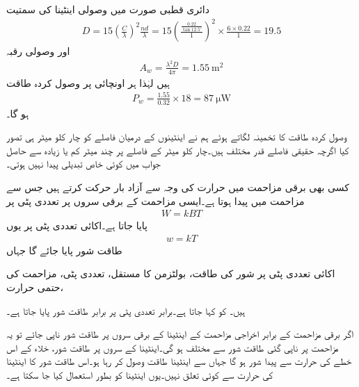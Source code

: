 دائری قطبی صورت میں وصولی اینٹینا کی سمتیت
\begin{align*}
D=15 \left(\frac{C}{\lambda}\right)^2\frac{n d}{\lambda}=15 \left(\frac{\frac{0.22}{\tan 12.5^{\circ}}}{1} \right)^2\times \frac{6 \times 0.22}{1}=19.5
\end{align*}
اور وصولی رقبہ
\begin{align*}
A_w=\frac{\lambda^2 D}{4\pi}=\SI{1.55}{\meter\squared}
\end{align*}
ہیں لہٰذا ہر اونچائی پر وصول کردہ طاقت
\begin{align*}
P_w=\frac{1.55}{0.32} \times 18=\SI{87}{\micro \watt}
\end{align*}
ہو گا۔

وصول کردہ طاقت کا تخمینہ لگاتے ہوئے ہم نے اینٹینوں کے درمیان فاصلے کو چار کلو میٹر ہی تصور کیا اگرچہ حقیقی فاصلے قدر مختلف ہیں۔چار کلو میٹر کے فاصلے پر چند میٹر کم یا زیادہ سے حاصل جواب میں کوئی خاص تبدیلی پیدا نہیں ہوتی۔

کسی بھی برقی مزاحمت  میں حرارت  کی وجہ سے آزاد بار حرکت کرتے ہیں جس سے مزاحمت میں  پیدا ہوتا ہے۔ایسی مزاحمت کے برقی سروں پر  تعددی پٹی پر 
\begin{align}\label{مساوات_اینٹینا_طاقت_شور_الف}
W=k B T
\end{align}
 پایا جاتا ہے۔اکائی تعددی پٹی پر یوں
\begin{align}
w=kT
\end{align}
طاقت شور پایا جائے گا جہاں
\begin{description}
 اکائی تعددی پٹی پر شور کی طاقت،  
 بولٹزمن کا مستقل، 
 تعددی پٹی، 
 مزاحمت کی حتمی حرارت، 
\end{description}
ہیں۔  کو  کہا جاتا ہے۔برابر تعددی پٹی پر برابر طاقت شور پایا جاتا ہے۔

اگر برقی مزاحمت  کے برابر اخراجی مزاحمت  کے اینٹینا کے برقی سروں پر طاقت شور ناپی جائے تو یہ مزاحمت پر ناپی گئی طاقت شور سے مختلف ہو گی۔اینٹینا کے سروں پر طاقت شور، خلاء کے اس خطے کی حرارت  سے پیدا شور ہو گا جہاں سے اینٹینا طاقت وصول کر رہا ہو۔اس طاقت شور کا اینٹینا کی حرارت سے کوئی تعلق نہیں۔یوں اینٹینا کو بطور  استعمال کیا جا سکتا ہے۔

